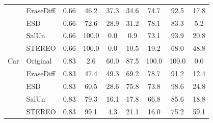 \begin{table}[htbp]
{\begin{tabular}{llccccccc}
& EraseDiff & 0.66 & 46.2 & 37.3 & 34.6 & 74.7 & 92.5 & 17.8 \\
& ESD       & 0.66 & 72.6 & 28.9 & 31.2 & 78.1 & 83.3 & 5.2 \\
& SalUn     & 0.66 & 100.0 & 0.0 & 0.9 & 73.1 & 93.9 & 20.8 \\
& STEREO    & 0.66 & 100.0 & 0.0 & 10.5 & 19.2 & 68.0 & 48.8 \\
\midrule
Car
& Original  & 0.83 & 2.6 & 60.0 & 87.5 & 100.0 & 100.0 & 0.0 \\
& EraseDiff & 0.83 & 47.4 & 49.3 & 69.2 & 78.7 & 91.2 & 12.4 \\
& ESD       & 0.83 & 60.5 & 28.6 & 75.8 & 73.8 & 98.6 & 24.8 \\
& SalUn     & 0.83 & 79.3 & 16.1 & 17.8 & 66.8 & 85.6 & 18.8 \\
& STEREO    & 0.83 & 99.1 & 4.3 & 21.1 & 16.0 & 75.2 & 59.1 \\
\bottomrule
\end{tabular}
}
\end{table}

